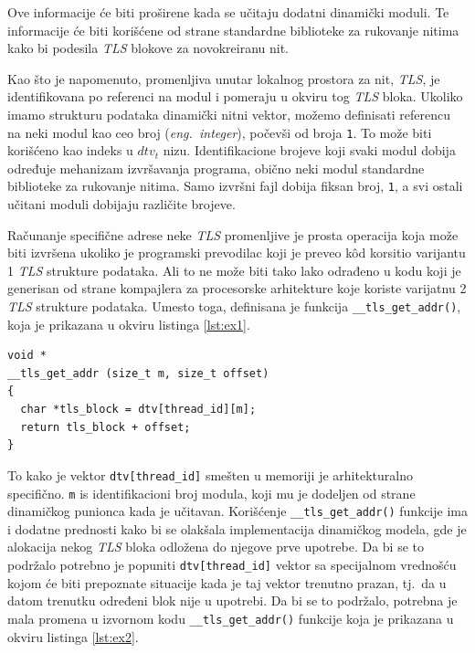 \documentclass[12pt,oneside]{memoir}
\begin{document}
Ove informacije će biti proširene kada se učitaju dodatni dinamički moduli. Te informacije će biti korišćene od strane standardne biblioteke za rukovanje nitima kako bi podesila \emph{TLS} blokove za novokreiranu nit.

Kao što je napomenuto, promenljiva unutar lokalnog prostora za nit, \emph{TLS}, je identifikovana po referenci na modul i pomeraju u okviru tog \emph{TLS} bloka. Ukoliko imamo strukturu podataka dinamički nitni vektor, možemo definisati referencu na neki modul kao ceo broj (\emph{eng.~integer}), počevši od broja \texttt{1}. To može biti korišćeno kao indeks u \texttt{$dtv_t$} nizu. Identifikacione brojeve koji svaki modul dobija određuje mehanizam izvršavanja programa, obično neki modul standardne biblioteke za rukovanje nitima. Samo izvršni fajl dobija fiksan broj, \texttt{1}, a svi ostali učitani moduli dobijaju različite brojeve.

Računanje specifične adrese neke \emph{TLS} promenljive je prosta operacija koja može biti izvršena ukoliko je programski prevodilac koji je preveo k\^{o}d korsitio varijantu 1 \emph{TLS} strukture podataka. Ali to ne može biti tako lako odrađeno u kodu koji je generisan od strane kompajlera za procesorske arhitekture koje koriste varijatnu 2 \emph{TLS} strukture podataka.
Umesto toga, definisana je funkcija \texttt{\_\_tls\_get\_addr()}, koja je prikazana u okviru listinga \ref{lst:ex1}.

\begin{lstlisting}[style=customc, label={lst:ex1}, caption={Implementacija funkcije \texttt{\_\_tls\_get\_addr()}.}]
void *
__tls_get_addr (size_t m, size_t offset)
{
  char *tls_block = dtv[thread_id][m];
  return tls_block + offset;
}

\end{lstlisting}

To kako je vektor \texttt{dtv[thread\_id]} smešten u memoriji je arhitekturalno specifično. \texttt{m} is identifikacioni broj modula, koji mu je dodeljen od strane dinamičkog punionca kada je učitavan. Korišćenje \texttt{\_\_tls\_get\_addr()} funkcije ima i dodatne prednosti kako bi se olakšala implementacija dinamičkog modela, gde je alokacija nekog \emph{TLS} bloka odložena do njegove prve upotrebe. Da bi se to podržalo potrebno je popuniti \texttt{dtv[thread\_id]} vektor sa specijalnom vrednošću kojom će biti prepoznate situacije kada je taj vektor trenutno prazan, tj.~da u datom trenutku određeni blok nije u upotrebi. Da bi se to podržalo, potrebna je mala promena u izvornom kodu \texttt{\_\_tls\_get\_addr()} funkcije koja je prikazana u okviru listinga \ref{lst:ex2}.
\end{document}
